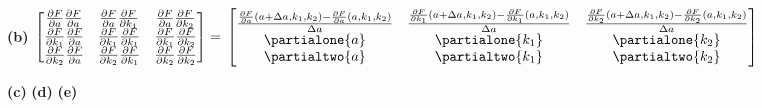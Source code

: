 \documentclass[11pt,letterpaper]{article}
\renewcommand{\part}[1] {\vspace{.10in} {\bf (#1)}}
\begin{document}
\part{b}
\newcommand{\dubpartial}[2]{\frac{\partial F}{\partial #1} \frac{\partial F}{\partial #2}}
\newcommand{\partiala}[1]{\frac{\frac{\partial F}{\partial #1}(a + \Delta a, k_1, k_2) - \frac{\partial F}{\partial #1}(a, k_1, k_2)}{\Delta a}}
\newcommand{\partialkone}[1]{\frac{\frac{\partial F}{\partial #1}(a, k_1 + \Delta k_1, k_2) - \frac{\partial F}{\partial #1}(a, k_1, k_2)}{\Delta k_1}}
\newcommand{\partialktwo}[1]{\frac{\frac{\partial F}{\partial #1}(a, k_1, k_2 + \Delta k_2) - \frac{\partial F}{\partial #1}(a, k_1, k_2)}{\Delta k_2}}
$
 \begin{bmatrix}
   \dubpartial{a}{a} & \dubpartial{a}{k_1} & \dubpartial{a}{k_2} \\
   \dubpartial{k_1}{a} & \dubpartial{k_1}{k_1} & \dubpartial{k_1}{k_2} \\
   \dubpartial{k_2}{a} & \dubpartial{k_2}{k_1} & \dubpartial{k_2}{k_2}
 \end{bmatrix}
 = \\
 \begin{bmatrix}
   \partiala{a} & \partiala{k_1} & \partiala{k_2} \\
   \partialone{a} & \partialone{k_1} & \partialone{k_2} \\
   \partialtwo{a} & \partialtwo{k_1} & \partialtwo{k_2}
 \end{bmatrix}
 $

\part{c}
\part{d}
\part{e}
\end{document}
